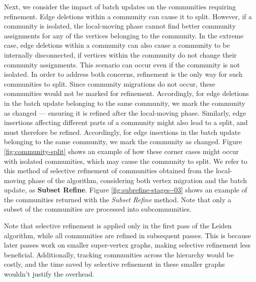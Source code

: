 Next, we consider the impact of batch updates on the communities requiring refinement. Edge deletions within a community can cause it to split. However, if a community is isolated, the local-moving phase cannot find better community assignments for any of the vertices belonging to the community. In the extreme case, edge deletions within a community can also cause a community to be internally disconnected, if vertices within the community do not change their community assignments. This scenario can occur even if the community is not isolated. In order to address both concerns, refinement is the only way for such communities to split. Since community migrations do not occur, these communities would not be marked for refinement. Accordingly, for edge deletions in the batch update belonging to the same community, we mark the community as changed --- ensuring it is refined after the local-moving phase. Similarly, edge insertions affecting different parts of a community might also lead to a split, and must therefore be refined. Accordingly, for edge insertions in the batch update belonging to the same community, we mark the community as changed. Figure \ref{fig:community-split} shows an example of how these corner cases might occur with isolated communities, which may cause the community to split. We refer to this method of selective refinement of communities obtained from the local-moving phase of the algorithm, considering both vertex migration and the batch update, as \textbf{Subset Refine}. Figure \ref{fig:subrefine-stages--03} shows an example of the communities returned with the \textit{Subset Refine} method. Note that only a subset of the communities are processed into subcommunities.

Note that selective refinement is applied only in the first pass of the Leiden algorithm, while all communities are refined in subsequent passes. This is because later passes work on smaller super-vertex graphs, making selective refinement less beneficial. Additionally, tracking communities across the hierarchy would be costly, and the time saved by selective refinement in these smaller graphs wouldn't justify the overhead.

